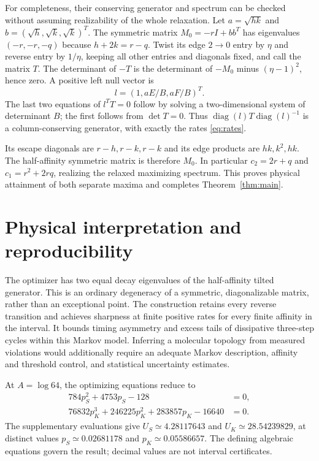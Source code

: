 \documentclass[11pt,a4paper]{article}
\begin{document}
For completeness, their conserving generator and spectrum can be checked without assuming realizability of the whole relaxation. Let $a=\sqrt{hk}$ and $b=(\sqrt h,\sqrt k,\sqrt k)^T$. The symmetric matrix $M_0=-rI+bb^T$ has eigenvalues $(-r,-r,-q)$ because $h+2k=r-q$. Twist its edge $2\to0$ entry by $\eta$ and reverse entry by $1/\eta$, keeping all other entries and diagonals fixed, and call the matrix $T$. The determinant of $-T$ is the determinant of $-M_0$ minus $(\eta-1)^2$, hence zero. A positive left null vector is
\begin{equation}
 l=(1,aE/B,aF/B)^T.
\end{equation}
The last two equations of $l^TT=0$ follow by solving a two-dimensional system of determinant $B$; the first follows from $\det T=0$. Thus $\operatorname{diag}(l)T\operatorname{diag}(l)^{-1}$ is a column-conserving generator, with exactly the rates \eqref{eq:rates}.

Its escape diagonals are $r-h,r-k,r-k$ and its edge products are $hk,k^2,hk$. The half-affinity symmetric matrix is therefore $M_0$. In particular $c_2=2r+q$ and $c_1=r^2+2rq$, realizing the relaxed maximizing spectrum. This proves physical attainment of both separate maxima and completes Theorem~\ref{thm:main}.

\section{Physical interpretation and reproducibility}
The optimizer has two equal decay eigenvalues of the half-affinity tilted generator. This is an ordinary degeneracy of a symmetric, diagonalizable matrix, rather than an exceptional point. The construction retains every reverse transition and achieves sharpness at finite positive rates for every finite affinity in the interval. It bounds timing asymmetry and excess tails of dissipative three-step cycles within this Markov model. Inferring a molecular topology from measured violations would additionally require an adequate Markov description, affinity and threshold control, and statistical uncertainty estimates.

At $A=\log64$, the optimizing equations reduce to
\begin{align}
 784p_S^2+4753p_S-128&=0,\\
 76832p_K^3+246225p_K^2+283857p_K-16640&=0.
\end{align}
The supplementary evaluations give $U_S\simeq4.28117643$ and $U_K\simeq28.54239829$, at distinct values $p_S\simeq0.02681178$ and $p_K\simeq0.05586657$. The defining algebraic equations govern the result; decimal values are not interval certificates.
\end{document}
